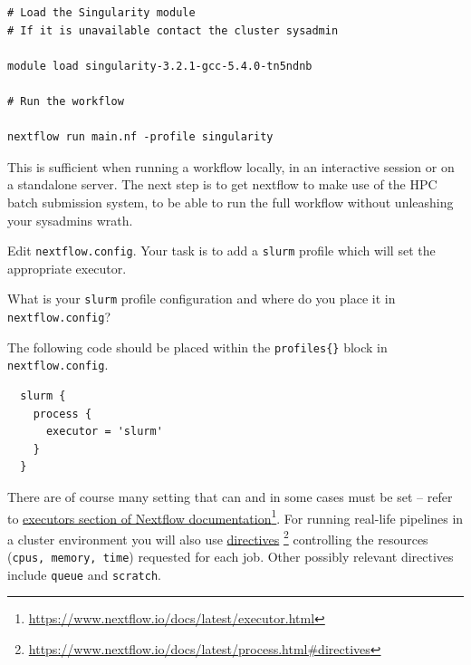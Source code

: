 \begin{steps}
\begin{lstlisting}
# Load the Singularity module 
# If it is unavailable contact the cluster sysadmin

module load singularity-3.2.1-gcc-5.4.0-tn5ndnb

# Run the workflow

nextflow run main.nf -profile singularity
\end{lstlisting}
\end{steps}

This is sufficient when running a workflow locally, in an interactive session or on a standalone server. 
The next step is to get nextflow to make use of the HPC batch submission system, to be able to run the full workflow 
without unleashing your sysadmins wrath.\\ 

\begin{steps}
Edit \texttt{nextflow.config}. Your task is to add a \texttt{slurm} profile which will set the appropriate executor. 
\end{steps}

\begin{questions}
What is your \texttt{slurm} profile configuration and where do you place it in \texttt{nextflow.config}?
\begin{answer}
The following code should be placed within the \texttt{profiles\{\}} block in \texttt{nextflow.config}.
\begin{lstlisting}
  slurm {
    process {
      executor = 'slurm'
    }
  }
\end{lstlisting}
\end{answer}
\end{questions}



There are of course many setting that can and in some cases must be set -- refer to 
\href{https://www.nextflow.io/docs/latest/executor.html}{executors section of Nextflow documentation}\footnote{\url{https://www.nextflow.io/docs/latest/executor.html}}. 
For running real-life pipelines in a cluster environment you will also use 
\href{https://www.nextflow.io/docs/latest/process.html#directives}{directives} \footnote{\url{https://www.nextflow.io/docs/latest/process.html\#directives}}
controlling the resources (\texttt{cpus, memory, time}) requested for each job. Other possibly relevant directives include \texttt{queue} and \texttt{scratch}.



